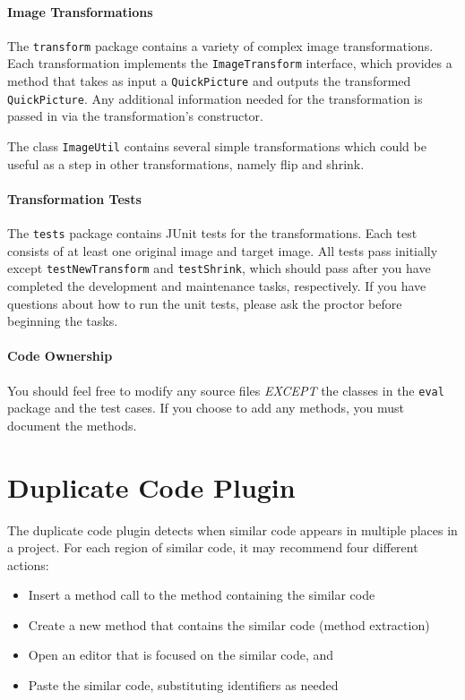 \documentclass[12pt]{article}
\begin{document}
\paragraph{Image Transformations}

The \verb|transform| package contains a variety of complex image
transformations.  Each transformation implements the
\verb|ImageTransform| interface, which provides a method that takes as
input a \verb|QuickPicture| and outputs the transformed
\verb|QuickPicture|. Any additional information needed for the
transformation is passed in via the transformation's constructor.

The class \verb|ImageUtil| contains several simple transformations
which could be useful as a step in other transformations, namely flip
and shrink.

\paragraph{Transformation Tests}

The \verb|tests| package contains JUnit tests for the
transformations. Each test consists of at least one original image and
target image. 
All tests pass initially except \verb|testNewTransform|
and \verb|testShrink|, which should pass after you have completed
the development and maintenance tasks, respectively.
If you have questions about how to run the unit tests,
please ask the proctor before beginning the tasks.


\paragraph{Code Ownership}  
You should feel free to modify any source files \textit{EXCEPT} the classes in
the \verb|eval| package and the test cases.  If you choose to add any methods,
you must document the methods.

\section{Duplicate Code Plugin}
The duplicate code plugin detects when similar code appears in
multiple places in a project. For each region of similar code, it may
recommend four different actions:

\begin{itemize}
  \item Insert a method call to the method containing the similar code
  \item Create a new method that contains the similar code (method extraction)
  \item Open an editor that is focused on the similar code, and
  \item Paste the similar code, substituting identifiers as needed
\end{itemize}
\end{document}
